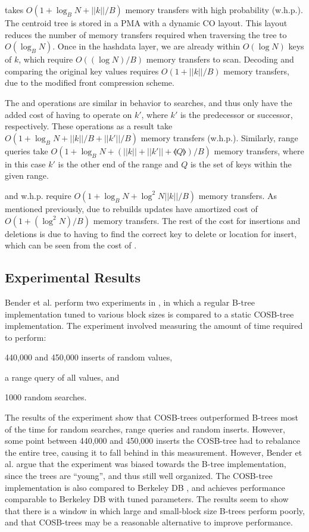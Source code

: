 \documentclass[preprint]{style}
\begin{document}
\Search{} takes $O(1+\log_{B}N+||k||/B)$ memory transfers with high probability
(w.h.p.).  The centroid tree is stored in a PMA with a dynamic CO layout. This
layout reduces the number of memory transfers required when traversing the tree
to $O(\log_{B}{N})$.  Once in the hashdata layer, we are already within $O(\log{N})$
keys of $k$, which require $O((\log{N})/B)$ memory transfers to scan. Decoding
and comparing the original key values requires $O(1+||k||/B)$ memory transfers,
due to the modified front compression scheme.

The \Pred{} and \Succ{} operations are similar in behavior to searches, and
thus only have the added cost of having to operate on $k'$, where $k'$ is the
predecessor or successor, respectively. These operations as a result take
$O(1+\log_{B}N+||k||/B+||k'||/B)$ memory transfers (w.h.p.). Similarly, range
queries take $O(1+\log_{B}N+(||k||+||k'||+\llangle{}Q\rrangle{})/B)$ memory
transfers, where in this case $k'$ is the other end of the range and $Q$ is the
set of keys within the given range.

\Insertkonly{} and \Delete{} w.h.p. require $O(1+\log_{B}N+\log^{2}N||k||/B)$
memory transfers. As mentioned previously, due to rebuilds updates have
amortized cost of $O(1+(\log^{2}N)/B)$ memory transfers. The rest of the cost
for insertions and deletions is due to having to find the correct key to
delete or location for insert, which can be seen from the cost of \Search{}.

\subsection{Experimental Results}
Bender et al. perform two experiments in \cite{BenderFaKu06}, in which a
regular B-tree implementation tuned to various block sizes is compared to a
static COSB-tree implementation. The experiment involved measuring the amount
of time required to perform:
\begin{inparaenum}[(a)]
  \item 440,000 and 450,000 inserts of random values, 
  \item a range query of all values, and 
  \item 1000 random searches.
\end{inparaenum} The results of the
experiment show that COSB-trees outperformed B-trees most of the time for
random searches, range queries and random inserts. However, some point between
440,000 and 450,000 inserts the COSB-tree had to rebalance the entire tree,
causing it to fall behind in this measurement. However, Bender et al. argue
that the experiment was biased towards the B-tree implementation, since the
trees are ``young'', and thus still well organized. The COSB-tree
implementation is also compared to Berkeley DB \cite{BerkeleyDB}, and achieves
performance comparable to Berkeley DB with tuned parameters. The results seem
to show that there is a window in which large and small-block size B-trees
perform poorly, and that COSB-trees may be a reasonable alternative to improve
performance. 
\end{document}
